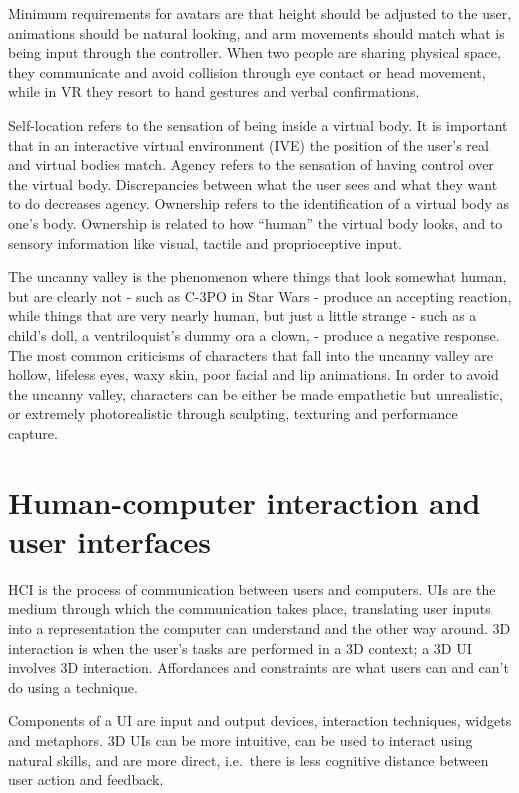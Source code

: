 \documentclass[a4paper]{article}
\begin{document}
Minimum requirements for avatars are that height should be adjusted to
the user, animations should be natural looking, and arm movements should
match what is being input through the controller. When two people are
sharing physical space, they communicate and avoid collision through eye
contact or head movement, while in VR they resort to hand gestures and
verbal confirmations.

Self-location refers to the sensation of being inside a virtual body. It
is important that in an interactive virtual environment (IVE) the
position of the user's real and virtual bodies match. Agency refers to
the sensation of having control over the virtual body. Discrepancies
between what the user sees and what they want to do decreases agency.
Ownership refers to the identification of a virtual body as one's body.
Ownership is related to how ``human'' the virtual body looks, and to
sensory information like visual, tactile and proprioceptive input.

The uncanny valley is the phenomenon where things that look somewhat
human, but are clearly not - such as C-3PO in Star Wars - produce an
accepting reaction, while things that are very nearly human, but just a
little strange - such as a child's doll, a ventriloquist's dummy ora a
clown, - produce a negative response. The most common criticisms of
characters that fall into the uncanny valley are hollow, lifeless eyes,
waxy skin, poor facial and lip animations. In order to avoid the uncanny
valley, characters can be either be made empathetic but unrealistic, or
extremely photorealistic through sculpting, texturing and performance
capture.


\section{Human-computer interaction and user
interfaces}

HCI is the process of communication between users and computers. UIs are
the medium through which the communication takes place, translating user
inputs into a representation the computer can understand and the other
way around. 3D interaction is when the user's tasks are performed in a
3D context; a 3D UI involves 3D interaction. Affordances and constraints
are what users can and can't do using a technique.

Components of a UI are input and output devices, interaction techniques,
widgets and metaphors. 3D UIs can be more intuitive, can be used to
interact using natural skills, and are more direct, i.e.~there is less
cognitive distance between user action and feedback.
\end{document}

